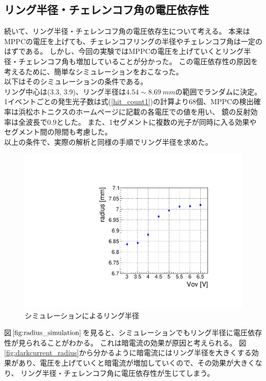 \documentclass[uplatex, titlepage, dvipdfmx, 12pt, a4paper]{jsreport}
\begin{document}
    \subsection{リング半径・チェレンコフ角の電圧依存性}
    続いて、リング半径・チェレンコフ角の電圧依存生について考える。
    本来はMPPCの電圧を上げても、チェレンコフリングの半径やチェレンコフ角は一定のはずである。
    しかし、今回の実験ではMPPCの電圧を上げていくとリング半径・チェレンコフ角も増加していることが分かった。
    この電圧依存性の原因を考えるために、簡単なシミュレーションをおこなった。\\
    以下はそのシミュレーションの条件である。\\
    リング中心は(3.3, 3.9)、リング半径は$4.54\sim\SI{8.69}{mm}$の範囲でランダムに決定。
    1イベントごとの発生光子数は式(\ref{hit_count1})の計算より68個、MPPCの検出確率は浜松ホトニクスのホームページに記載の各電圧での値を用い、
    鏡の反射効率は全波長で$0.9$とした。
    また、1セグメントに複数の光子が同時に入る効果やセグメント間の隙間も考慮した。\\
    以上の条件で、実際の解析と同様の手順でリング半径を求めた。
    \begin{figure}[hbtp]
      \begin{center} 
        \includegraphics[scale=0.4, clip]{image/radius_simulation.pdf}
        \caption{シミュレーションによるリング半径} 
        \label{fig:radius_simulation} 
      \end{center}
    \end{figure}
    図$\ref{fig:radius_simulation}$を見ると、シミュレーションでもリング半径に電圧依存性が見られることがわかる。
    これは暗電流の効果が原因と考えられる。
    図\ref{fig:darkcurrent_radius}から分かるように暗電流にはリング半径を大きくする効果があり、電圧を上げていくと暗電流が増加していくので、その効果が大きくなり、
    リング半径・チェレンコフ角に電圧依存性が生じてしまう。
\end{document}
